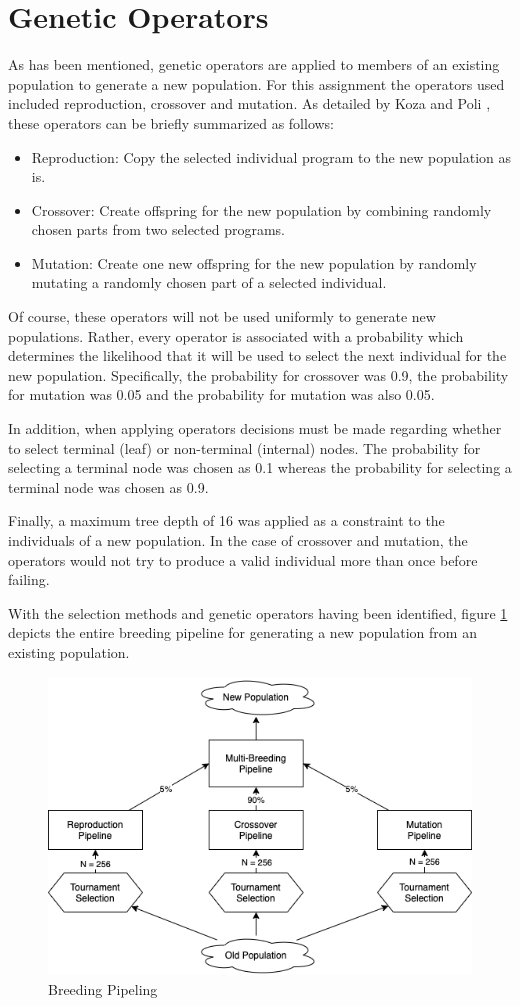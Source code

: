 \section{Genetic Operators}\label{sec:genetic_operators}
As has been mentioned, genetic operators are applied to members of an existing population to generate a new population. For this assignment the operators used included reproduction, crossover and mutation. As detailed by Koza and Poli \cite{koza2005genetic}, these operators can be briefly summarized as follows:

\begin{itemize}
    \item Reproduction: Copy the selected individual program to the new population as is.
    \item Crossover: Create offspring for the new population by combining randomly chosen parts from two selected programs.
    \item Mutation: Create one new offspring for the new population by randomly mutating a randomly chosen part of a selected individual.
\end{itemize}

Of course, these operators will not be used uniformly to generate new populations. Rather, every operator is associated with a probability which determines the likelihood that it will be used to select the next individual for the new population. Specifically, the probability for crossover was 0.9, the probability for mutation was 0.05 and the probability for mutation was also 0.05.

In addition, when applying operators decisions must be made regarding whether to select terminal (leaf) or non-terminal (internal) nodes. The probability for selecting a terminal node was chosen as 0.1 whereas the probability for selecting a terminal node was chosen as 0.9. 

Finally, a maximum tree depth of 16 was applied as a constraint to the individuals of a new population. In the case of crossover and mutation, the operators would not try to produce a valid individual more than once before failing.

With the selection methods and genetic operators having been identified, figure \ref{fig:breeding_pipeline} depicts the entire breeding pipeline for generating a new population from an existing population.

\begin{figure}[H]
\centering
\includegraphics[width=\textwidth]{report/6_genetic_operators/breeding_pipeline.png}
\caption{Breeding Pipeling}
\label{fig:breeding_pipeline}
\end{figure}